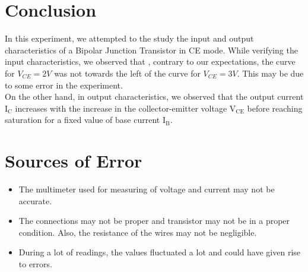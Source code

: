 \documentclass[12pt]{article}
\begin{document}
\section{Conclusion}
In this experiment, we attempted to the study the input and output characteristics of a Bipolar Junction Transistor in CE mode. While verifying the input characteristics, we observed that , contrary to our expectations, the curve for $V_{CE}=2V$ was not towards the left of the curve for $V_{CE}=3V$. This may be due to some error in the experiment. \\
On the other hand, in output characteristics, we observed that the output current $\mathrm{I_C}$ increases with the increase in the collector-emitter voltage $\mathrm{V_{CE}}$ before reaching saturation for a fixed value of base current $\mathrm{I_B}$. 
\section{Sources of Error}
\begin{itemize}
    \item The multimeter used for measuring of voltage and current may not be accurate.
    \item The connections may not be proper and transistor may not be in a proper condition. Also, the resistance of the wires may not be negligible.
    \item During a lot of readings, the values fluctuated a lot and could have given rise to errors.
\end{itemize}

 
\end{document}
